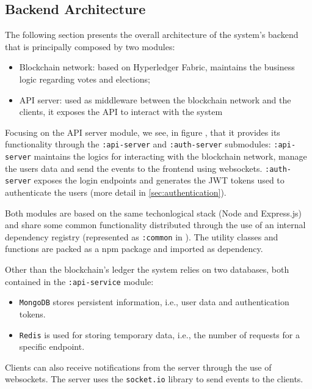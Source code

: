 \documentclass{scrartcl}
\begin{document}
\subsection{Backend Architecture}
The following section presents the overall architecture of the system's backend that is principally composed  by two modules:
\begin{itemize}
    \item Blockchain network: based on Hyperledger Fabric, maintains the business logic regarding votes and elections;
    \item API server: used as middleware between the blockchain network and the clients, it exposes the API to interact with the system
\end{itemize}

Focusing on the API server module, we see, in figure , that it provides its functionality through the \texttt{:api-server} and \texttt{:auth-server} submodules: \texttt{:api-server} maintains the logics for interacting with the blockchain network, manage the users data and send the events to the frontend using websockets. \texttt{:auth-server} exposes the login endpoints and generates the JWT tokens used to authenticate the users (more detail in \ref{sec:authentication}).

Both modules are based on the same techonlogical stack (Node and Express.js) and share some common functionality distributed through the use of an internal dependency registry (represented as \texttt{:common} in ). The utility classes and functions are packed as a npm package and imported as dependency.

Other than the blockchain's ledger the system relies on two databases, both contained in the \texttt{:api-service} module:
\begin{itemize}
    \item \texttt{MongoDB} stores persistent information, i.e., user data and authentication tokens.
    \item \texttt{Redis} is used for storing temporary data, i.e., the number of requests for a specific endpoint.
\end{itemize}

Clients can also receive notifications from the server through the use of websockets. The server uses the \texttt{socket.io} library to send events to the clients.
\end{document}
